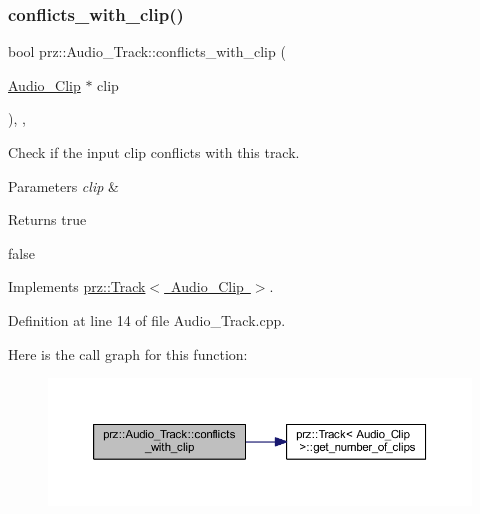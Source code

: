 \subsubsection{\texorpdfstring{conflicts\_with\_clip()}{conflicts\_with\_clip()}}
{\footnotesize\ttfamily bool prz\+::\+Audio\+\_\+\+Track\+::conflicts\+\_\+with\+\_\+clip (\begin{DoxyParamCaption}\item[{\mbox{\hyperlink{classprz_1_1_audio___clip}{Audio\+\_\+\+Clip}} $\ast$}]{clip }\end{DoxyParamCaption})\hspace{0.3cm}{\ttfamily [final]}, {\ttfamily [override]}, {\ttfamily [virtual]}}



Check if the input clip conflicts with this track. 


\begin{DoxyParams}{Parameters}
{\em clip} & \\
\hline
\end{DoxyParams}
\begin{DoxyReturn}{Returns}
true 

false 
\end{DoxyReturn}


Implements \mbox{\hyperlink{classprz_1_1_track_aefad1eca406d312dbafec624435b4420}{prz\+::\+Track$<$ Audio\+\_\+\+Clip $>$}}.



Definition at line 14 of file Audio\+\_\+\+Track.\+cpp.

Here is the call graph for this function\+:
\nopagebreak
\begin{figure}[H]
\begin{center}
\leavevmode
\includegraphics[width=350pt]{classprz_1_1_audio___track_a6487c33aca7d2d496ca39037f5f75170_cgraph}
\end{center}
\end{figure}
\mbox{\label{classprz_1_1_audio___track_ac10fc428fddc350fb7e6b4d29d287a3a}} 
